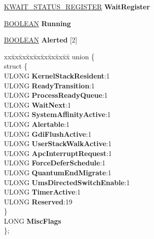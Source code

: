 \begin{DoxyCompactItemize}
\item 
\mbox{\label{struct___k_t_h_r_e_a_d_ad7969427a6b052a1b918a5cedb6d8614}} 
\hyperlink{union___k_w_a_i_t___s_t_a_t_u_s___r_e_g_i_s_t_e_r}{K\+W\+A\+I\+T\+\_\+\+S\+T\+A\+T\+U\+S\+\_\+\+R\+E\+G\+I\+S\+T\+ER} {\bfseries Wait\+Register}
\item 
\mbox{\label{struct___k_t_h_r_e_a_d_a4607a7f086b2f1f2810d1921f0205276}} 
\hyperlink{_processor_bind_8h_a112e3146cb38b6ee95e64d85842e380a}{B\+O\+O\+L\+E\+AN} {\bfseries Running}
\item 
\mbox{\label{struct___k_t_h_r_e_a_d_aebec404c4aa2937394e228a7650b73a9}} 
\hyperlink{_processor_bind_8h_a112e3146cb38b6ee95e64d85842e380a}{B\+O\+O\+L\+E\+AN} {\bfseries Alerted} \mbox{[}2\mbox{]}
\item 
\mbox{\label{struct___k_t_h_r_e_a_d_a968319d0d28492c66511cdd10a567ed8}} 
\begin{tabbing}
xx\=xx\=xx\=xx\=xx\=xx\=xx\=xx\=xx\=\kill
union \{\\
\mbox{\label{union___k_t_h_r_e_a_d_1_1_0D2088_a572509452db8bb4a0423eb1f461baedc}} 
\>struct \{\\
\>\>ULONG {\bfseries KernelStackResident}:1\\
\>\>ULONG {\bfseries ReadyTransition}:1\\
\>\>ULONG {\bfseries ProcessReadyQueue}:1\\
\>\>ULONG {\bfseries WaitNext}:1\\
\>\>ULONG {\bfseries SystemAffinityActive}:1\\
\>\>ULONG {\bfseries Alertable}:1\\
\>\>ULONG {\bfseries GdiFlushActive}:1\\
\>\>ULONG {\bfseries UserStackWalkActive}:1\\
\>\>ULONG {\bfseries ApcInterruptRequest}:1\\
\>\>ULONG {\bfseries ForceDeferSchedule}:1\\
\>\>ULONG {\bfseries QuantumEndMigrate}:1\\
\>\>ULONG {\bfseries UmsDirectedSwitchEnable}:1\\
\>\>ULONG {\bfseries TimerActive}:1\\
\>\>ULONG {\bfseries Reserved}:19\\
\>\} \\
\>LONG {\bfseries MiscFlags}\\
\}; \\


\end{tabbing}
\end{DoxyCompactItemize}
